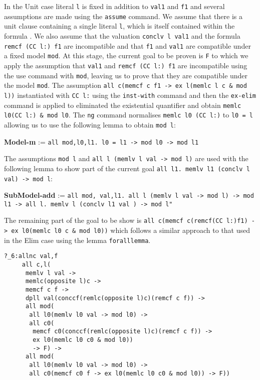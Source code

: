 In the Unit case literal \texttt{l} is fixed in addition to \texttt{val1} and \texttt{f1} and several assumptions are made using the \texttt{assume} command.  We assume that there is a unit clause containing a single literal \texttt{l}, which is itself contained within the formula . We also assume that the valuation \texttt{conclv l val1} and the formula \texttt{remcf (CC l:) f1} are incompatible and that \texttt{f1} and \texttt{val1} are compatible under a fixed model \texttt{mod}. At this stage, the current goal to be proven is \texttt{F} to which we apply the assumption that \texttt{val1} and \texttt{remcf (CC l:) f1} are incompatible using the use command with \texttt{mod}, leaving us to prove that they are compatible under the model \texttt{mod}. The assumption  \texttt{all c(memcf c f1 -> ex l(memlc l c \& mod l))} instantiated with \texttt{CC l:} using the \texttt{inst-with} command and then the \texttt{ex-elim} command is applied to eliminated the existential quantifier and obtain \texttt{memlc l0(CC l:) \& mod l0}. The \texttt{ng} command normalises \texttt{memlc l0 (CC l:)} to \texttt{l0 = l} allowing us to use the following lemma to obtain \texttt{mod l}:

\begin{center}
\textbf{Model-m} := \texttt{all mod,l0,l1. l0 = l1 -> mod l0 -> mod l1} \\
\end{center}

The assumptions \texttt{mod l} and \texttt{all l (memlv l val -> mod l)}  are used with the following lemma to show part of the current goal \texttt{all l1. memlv l1 (conclv l val) -> mod l}:
\begin{center}
\textbf{SubModel-add} := \texttt{all mod, val,l1. all l (memlv l val  -> mod l) -> mod l1 -> all l. memlv l (conclv l1 val ) -> mod l"} \\
\end{center}

The remaining part of the goal to be show is \texttt{all c(memcf c(remcf(CC l:)f1) -> ex l0(memlc l0 c \& mod l0))} which follows a similar approach to that used in the Elim case using the lemma \texttt{foralllemma}.

\begin{lstlisting}[caption = "The Reduce Case in Minlog"]
?_6:allnc val,f
     all c,l(
      memlv l val ->
      memlc(opposite l)c ->
      memcf c f ->
      dpll val(conccf(remlc(opposite l)c)(remcf c f)) ->
      all mod(
       all l0(memlv l0 val -> mod l0) ->
       all c0(
        memcf c0(conccf(remlc(opposite l)c)(remcf c f)) ->
        ex l0(memlc l0 c0 & mod l0)) 
        -> F) ->
      all mod(
       all l0(memlv l0 val -> mod l0) ->
       all c0(memcf c0 f -> ex l0(memlc l0 c0 & mod l0)) -> F))
\end{lstlisting}

